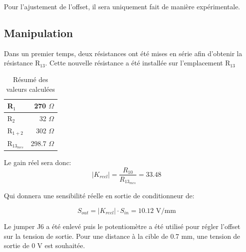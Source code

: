 Pour l'ajustement de l'offset, il sera uniquement fait de manière expérimentale.

\subsection{Manipulation}
Dans un premier temps, deux résistances ont été mises en série afin d'obtenir la résistance
R$_{13}$. Cette nouvelle résistance a été installée sur l'emplacement R$_{13}$

\begin{table}[H]
    \centering
    \begin{tabular}{|l|r|}
    \cline{1-2}
    R$_{1}$   & 270 $\Omega$   \\ \hline
    R$_{2}$   & 32  $\Omega$        \\ \hline
    R$_{1+2}$ & 302 $\Omega$ \\ \hline
    R$_{13_{mes}}$ & 298.7 $\Omega$ \\ \hline
    \end{tabular}
    \caption{Résumé des valeurs calculées}
    \label{tab:ResumeValeurs}
\end{table}

Le gain réel sera donc:
\begin{equation*}
    |K_{reel}| = \frac{R_{10}}{R_{13_{mes}}} = 33.48   
\end{equation*}

Qui donnera une sensibilité réelle en sortie de conditionneur de:

\begin{equation*}
    S_{out} = |K_{reel}|\cdot S_{in} =10.12 \text{ V/mm} 
\end{equation*}
\vspace{0.2cm}

Le jumper J6 a été enlevé puis le potentiomètre a été utilisé pour régler l'offset sur la tension 
de sortie. Pour une distance à la cible de 0.7 mm, une tension de sortie de 0 V est souhaitée.
\vspace{0.2cm}

